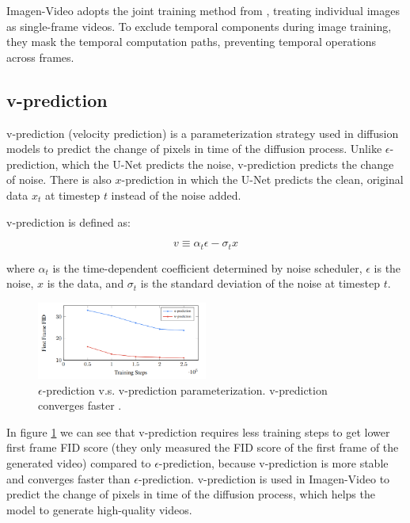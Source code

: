 Imagen-Video adopts the joint training method from \cite{video_diffusion_models}, treating individual images as single-frame videos. To exclude temporal components during image training, they mask the temporal computation paths, preventing temporal operations across frames.




















\subsection{v-prediction}

v-prediction (velocity prediction) is a parameterization strategy used in diffusion models to predict the change of pixels in time of the diffusion process. Unlike $\epsilon$-prediction, which the U-Net predicts the noise, v-prediction predicts the change of noise. There is also $x$-prediction in which the U-Net predicts the clean, original data $x_t$ at timestep $t$ instead of the noise added.

v-prediction is defined as:

\[ v \equiv \alpha_t \epsilon - \sigma_t x \]

where $\alpha_t$ is the time-dependent coefficient determined by noise scheduler, $\epsilon$ is the noise, $x$ is the data, and $\sigma_t$ is the standard deviation of the noise at timestep $t$.

\begin{figure}
    \centering
    \includegraphics[width=0.5\textwidth]{images/imagen_video/e_prediction_vs_v_prediction_2.png}
    \caption{$\epsilon$-prediction v.s. v-prediction parameterization. v-prediction converges faster \cite{imagen_video}.}
    \label{fig:imagen_video_epsilon_prediction_vs_v_prediction_2}
\end{figure}

In figure \ref{fig:imagen_video_epsilon_prediction_vs_v_prediction_2} we can see that v-prediction requires less training steps to get lower first frame FID score (they only measured the FID score of the first frame of the generated video) compared to $\epsilon$-prediction, because v-prediction is more stable and converges faster than $\epsilon$-prediction. v-prediction is used in Imagen-Video to predict the change of pixels in time of the diffusion process, which helps the model to generate high-quality videos.













